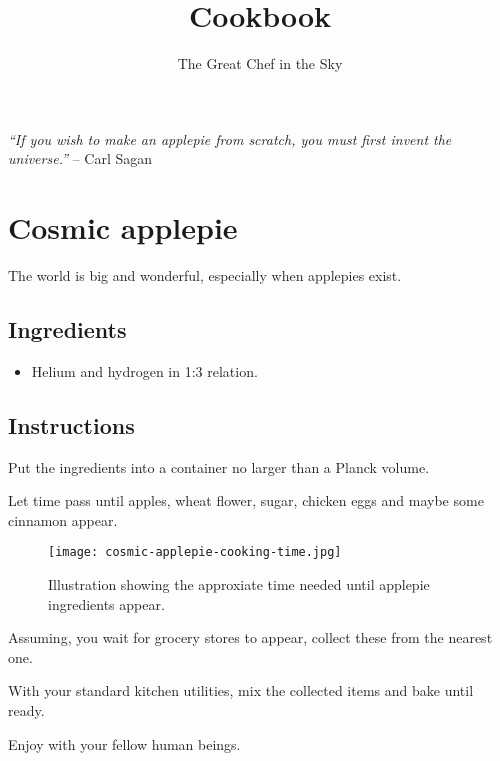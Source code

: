 \documentclass[11pt]{article}
\title{Cookbook}
\author{The Great Chef in the Sky}
\begin{document}
\maketitle

\begin{displayquote}
\emph{``If you wish to make an applepie from scratch, you must first invent the universe.''}
-- Carl Sagan
\end{displayquote}

\section*{Cosmic applepie}

The world is big and wonderful, especially when applepies exist.

\subsection*{Ingredients}

\begin{itemize}
\item Helium and hydrogen in 1:3 relation.
\end{itemize}

\subsection*{Instructions}

Put the ingredients into a container no larger than a Planck volume.

Let time pass until apples, wheat flower, sugar, chicken eggs and maybe some cinnamon appear.

\begin{figure}[h]
\centering
\texttt{[image: cosmic-applepie-cooking-time.jpg]}
\caption{Illustration showing the approxiate time needed until applepie ingredients appear.}
\end{figure}


Assuming, you wait for grocery stores to appear, collect these from the nearest one.

With your standard kitchen utilities, mix the collected items and bake until ready.

Enjoy with your fellow human beings.
\end{document}
